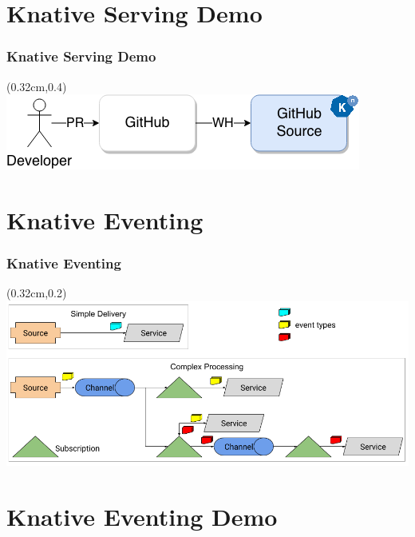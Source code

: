 \documentclass[aspectratio=169,11pt,hyperref={colorlinks=true}]{beamer}
\begin{document}
\begin{lblackrwhiteframe}
\begin{lblackrwhiteframe}
\section{Knative Serving Demo}

\begin{tblackbgrayframe}
  \frametitle{Knative Serving Demo}
  \begin{textblock*}{\paperwidth}(0.32cm,0.4\paperheight)
    \centering
    \includegraphics[width=0.65\paperwidth]{img/knative-serving-demo.png}
  \end{textblock*}
\end{tblackbgrayframe}

\section{Knative Eventing}

\begin{tblackbgrayframe}
  \frametitle{Knative Eventing}
  \begin{textblock*}{\paperwidth}(0.32cm,0.2\paperheight)
    \centering
    \includegraphics[width=0.9\paperwidth]{img/eventing-control-plane.png}
  \end{textblock*}
\end{tblackbgrayframe}

\section{Knative Eventing Demo}


\end{lblackrwhiteframe}
\end{lblackrwhiteframe}
\end{document}
